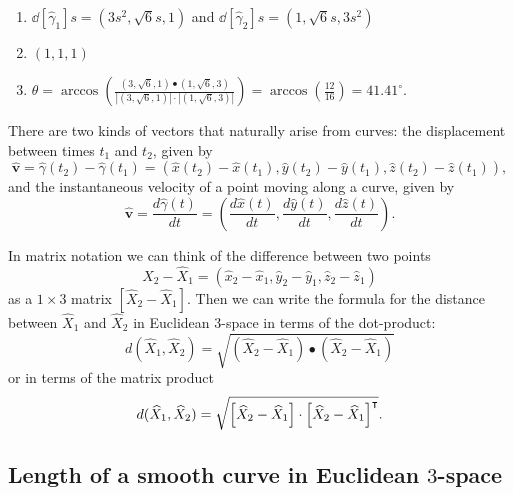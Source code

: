\documentclass[newpage,hints,handout]{ximera}
\begin{document}
\begin{problem}
\begin{freeResponse}
\begin{enumerate}
\item  $\dd[\hat{\gamma}_{1}]{s} = \left(3s^2, \sqrt{6}s, 1 \right)$ and 
$\dd[\hat{\gamma}_{2}]{s} =  \left(1, \sqrt{6}s,  3s^2 \right)$

\item $\left(1,1,1 \right)$

\item 
$\theta = \arccos \left( 
   \frac{ \left(3, \sqrt{6} , 1 \right) \bullet \left(1, \sqrt{6} , 3 \right)}
   { |\left(3, \sqrt{6} , 1 \right)| \cdot |\left(1, \sqrt{6} , 3 \right)|} \right)
= \arccos \left( \frac{12}{16} \right) = 41.41^{\circ}.$

\end{enumerate}
\end{freeResponse}

\end{problem}

There are two kinds of vectors that naturally arise from curves: the
displacement between times $t_1$ and $t_2$, given by%
\[
\hat{\mathbf v}=\hat{\gamma}(t_2)-\hat{\gamma}(t_1)=
(\hat{x}(t_2)-\hat{x}(t_1),\hat{y}(t_2)-\hat{y}(t_1),\hat{z}(t_2)-\hat{z}(t_1)),
\]
and the instantaneous velocity of a point moving along a curve, given by%
\[
\hat{\mathbf v}=\frac{d\hat{\gamma}(t)}{dt}=
\left(\frac{d\hat{x}(t)}{dt},\frac{d\hat{y}(t)}{dt},\frac{d\hat{z}(t)}{dt}\right).
\]

In matrix notation we can think of the difference between two points
\[
\hat{X}_{2}-\hat{X}_{1}=\left(  \hat{x}_{2}-\hat{x}_{1},\hat{y}_{2}-\hat
{y}_{1},\hat{z}_{2}-\hat{z}_{1}\right)
\]
as a $1\times3$ matrix $\left[\hat{X}_{2}-\hat{X}_{1}\right]$. Then we can
write the formula for the distance between $\hat{X}_{1}$ and
$\hat{X}_{2}$ in Euclidean $3$-space in terms of the dot-product:%
\begin{equation}
  d(\hat{X}_{1},\hat{X}_{2})=\sqrt{(\hat{X}_{2}-\hat{X}_{1})\bullet
    (\hat{X}_{2}-\hat{X}_{1})} \label{13}%
\end{equation}
or in terms of the matrix product%
\[
d(\widehat{X}_{1},\widehat{X}_{2}) =\sqrt{\left[\widehat{X}_{2}-\widehat{X}_{1} \right]
  \cdot\left[\widehat{X}_{2}-\widehat{X}_{1}\right]^\intercal }.
\]


\subsection*{Length of a smooth curve in Euclidean $3$-space}
\end{document}
